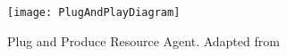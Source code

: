 \begin{figure}
	\centering
	\texttt{[image: PlugAndPlayDiagram]}
	\caption{Plug and Produce Resource Agent. Adapted from \cite{8972169}}
	\label{fig:plug_and_play_device_architecture}
\end{figure}
%
%
